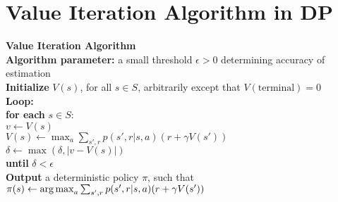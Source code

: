 \documentclass[../xlapes02]{subfiles}
\begin{document}
    \section{Value Iteration Algorithm in DP}
    \begin{algorithm}[H]
        \label{alg:value-iteration}
        \SetAlgoLined
        \textbf{Value Iteration Algorithm}\\
        \textbf{Algorithm parameter:} a small threshold $\epsilon > 0$ determining accuracy of estimation\\
        \textbf{Initialize} $V(s)$, for all $s \in S$, arbitrarily except that $V(\text{terminal}) = 0$\\
        \textbf{Loop:}\\
        \quad \textbf{for each} $s \in S:$\\
        \quad \quad $v \leftarrow V(s)$\\
        \quad \quad $V(s) \leftarrow \max_a \sum_{s', r} p(s', r|s, a)(r + \gamma V(s'))$\\
        \quad \quad $\delta \leftarrow \max(\delta, |v - V(s)|)$\\
        \textbf{until} $\delta < \epsilon$\\
        \textbf{Output} a deterministic policy $\pi$, such that\\
        $\pi(s) \leftarrow \operatorname*{arg\,max}_a \sum_{s', r} p(s', r|s, a)(r + \gamma V(s'))$\\
    \end{algorithm}

%
%
%
%
%
%
%
\end{document}
